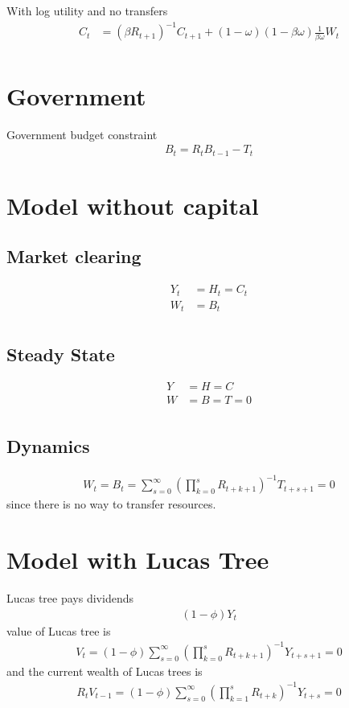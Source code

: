 \documentclass[11pt]{article}
\begin{document}
With log utility and no transfers
\begin{align*}
    C_{t}&=(\beta R_{t+1})^{-1}C_{t+1} + (1-\omega)(1-\beta\omega) \frac{1}{\beta\omega}W_{t} \\
\end{align*}

\section{Government}

Government budget constraint
\begin{align*}
    B_t = R_t B_{t-1} - T_t
\end{align*}

\section{Model without capital}

\subsection{Market clearing}
\begin{align*}
    Y_t &= H_t = C_t \\
    W_t &= B_t \\
\end{align*}

\subsection{Steady State}
\begin{align*}
    Y &= H = C \\
    W &= B = T = 0 \\
\end{align*}

\subsection{Dynamics}
\begin{align*}
    W_t = B_t = \sum_{s=0}^{\infty}(\prod_{k=0}^{s}R_{t+k+1})^{-1}T_{t+s+1} = 0
\end{align*}
since there is no way to transfer resources.

\section{Model with Lucas Tree}

Lucas tree pays dividends
\begin{align*}
    (1 - \phi) Y_t
\end{align*}
value of Lucas tree is
\begin{align*}
    V_t = (1 - \phi)\sum_{s=0}^{\infty}(\prod_{k=0}^{s}R_{t+k+1})^{-1}Y_{t+s+1} = 0
\end{align*}
and the current wealth of Lucas trees is
\begin{align*}
    R_{t}V_{t-1} = (1 - \phi)\sum_{s=0}^{\infty}(\prod_{k=1}^{s}R_{t+k})^{-1}Y_{t+s} = 0
\end{align*}
\end{document}

